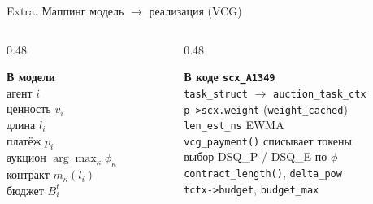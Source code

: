\documentclass[aspectratio=169,11pt]{beamer}
\begin{document}
\begin{frame}{Extra. Маппинг модель $\to$ реализация (VCG)}
        \scriptsize
        \begin{columns}[T]
                \begin{column}{0.48\textwidth}
                        \begin{shadowbox}
                                \textbf{В модели}\\[2pt]
                                агент $i$\\
                                ценность $v_i$\\
                                длина $l_i$\\
                                платёж $p_i$\\
                                аукцион $\arg\max_\kappa \phi_\kappa$\\
                                контракт $m_\kappa(l_i)$\\
                                бюджет $B_i^t$
                        \end{shadowbox}
                \end{column}
                \begin{column}{0.48\textwidth}
                        \begin{shadowbox2}
                                \textbf{В коде \texttt{scx\_A1349}}\\[2pt]
                                \texttt{task\_struct} $\to$ \texttt{auction\_task\_ctx}\\
                                \texttt{p->scx.weight} (\texttt{weight\_cached})\\
                                \texttt{len\_est\_ns} EWMA\\
                                \texttt{vcg\_payment()} списывает токены\\
                                выбор DSQ\_P / DSQ\_E по $\phi$\\
                                \texttt{contract\_length()}, \texttt{delta\_pow}\\
                                \texttt{tctx->budget}, \texttt{budget\_max}
                        \end{shadowbox2}
                \end{column}
        \end{columns}


\end{frame}
\end{document}
